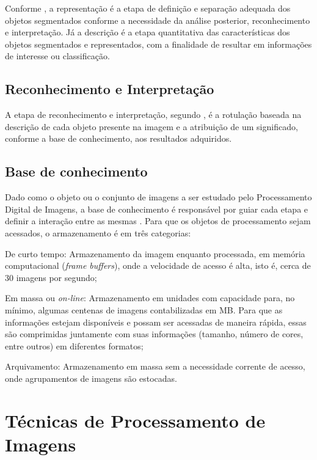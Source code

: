 \documentclass[12pt,oneside,a4paper,chapter=TITLE,section=TITLE,sumario=tradicional]{abntex2}
\begin{document}
Conforme , a representação é a etapa de definição e separação adequada dos objetos segmentados conforme a necessidade da análise posterior, reconhecimento e interpretação. Já a descrição é a etapa quantitativa das características dos objetos segmentados e representados, com a finalidade de resultar em informações de interesse ou classificação.

\subsection{Reconhecimento e Interpretação}

A etapa de reconhecimento e interpretação, segundo , é a rotulação baseada na descrição de cada objeto presente na imagem e a atribuição de um significado, conforme a base de conhecimento, aos resultados adquiridos.

\subsection{Base de conhecimento}
Dado como o objeto ou o conjunto de imagens a ser estudado pelo Processamento Digital de Imagens, a base de conhecimento é responsável por guiar cada etapa e definir a interação entre as mesmas . Para que os objetos de processamento sejam acessados, o armazenamento é em três categorias:
\begin{lista}
    \item De curto tempo: Armazenamento da imagem enquanto processada, em memória computacional (\textit{frame buffers}), onde a velocidade de acesso é alta, isto é, cerca de 30 imagens por segundo;
    \item Em massa ou \textit{on-line}: Armazenamento em unidades com capacidade para, no mínimo, algumas centenas de imagens contabilizadas em MB. Para que as informações estejam disponíveis e possam ser acessadas de maneira rápida, essas são comprimidas juntamente com suas informações (tamanho, número de cores, entre outros) em diferentes formatos;
    \item Arquivamento: Armazenamento em massa sem a necessidade corrente de acesso, onde agrupamentos de imagens são estocadas.
\end{lista}

\section{Técnicas de Processamento de Imagens}
\end{document}
